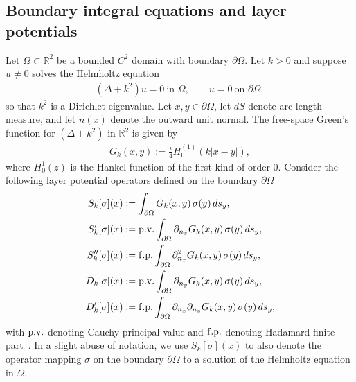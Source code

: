 \documentclass{amsart}
\theoremstyle{plain}
\begin{document}
\subsection{Boundary integral equations and layer potentials}
Let $\Omega\subset\mathbb{R}^2$ be a bounded $C^2$ domain with boundary $\partial \Omega$.
Let $k>0$ and suppose $u\neq 0$ solves the Helmholtz equation
  \begin{align}
    (\Delta + k^2)u = 0\ \text{in }\Omega,\qquad u=0\ \text{on }\partial \Omega,
    \label{homhelm}
  \end{align}
so that $k^2$ is a Dirichlet eigenvalue.
Let $x,y\in\partial \Omega$, let $dS$ denote arc-length measure, and let $n(x)$ denote the outward unit normal.
The free-space Green's function for $(\Delta+k^2)$ in $\mathbb{R}^2$ is given by
  \begin{align}
    G_k(x,y) := \frac{i}{4}H_0^{(1)}(k|x-y|),
  \end{align}
  where $H_{0}^{1}(z)$ is the Hankel function of the first kind of order $0$.
Consider the following layer potential operators defined on the boundary $\partial \Omega$
\begin{equation}
  \begin{aligned}
    S_k[\sigma](x)
    &:= \int_{\partial \Omega} G_k(x,y)\,\sigma(y)\,ds_y,\\
    S'_k[\sigma](x)
    &:= {\rm p.v.}\int_{\partial \Omega} \partial_{n_x}G_k(x,y)\,\sigma(y)\,ds_y,\\
    S''_k[\sigma](x)
    &:= {\rm f.p.}\int_{\partial \Omega} \partial_{n_x}^2G_k(x,y)\,\sigma(y)\,ds_y,\\
    D_k[\sigma](x)
    &:= {\rm p.v.}\int_{\partial \Omega} \partial_{n_y}G_k(x,y)\,\sigma(y)\,ds_y,\\
    D'_k[\sigma](x)
    &:= {\rm f.p.}\int_{\partial \Omega} \partial_{n_x}\partial_{n_y}G_k(x,y)\,\sigma(y)\,ds_y,
  \end{aligned}
  \label{eqn: layer_potentials}
  \end{equation}
with ${\rm p.v.}$ denoting Cauchy principal value and ${\rm f.p.}$ denoting Hadamard finite part~\cite{mclean2000strongly}. In a slight abuse of notation, we use $S_{k}[\sigma](x)$ to also denote the operator mapping $\sigma$ on the boundary $\partial \Omega$ to a solution of the Helmholtz equation in $\Omega$.
\end{document}
